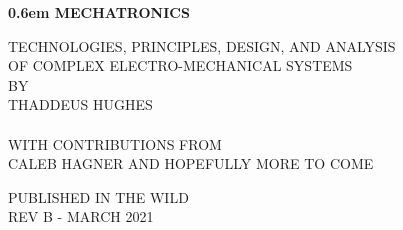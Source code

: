 




\clearpage
\newcommand\nbvspace[1][3]{\vspace*{\stretch{#1}}}
\newcommand\nbstretchyspace{\spaceskip0.5em plus 0.25em minus 0.25em}
\newcommand{\nbtitlestretch}{\spaceskip0.6em}
\pagestyle{plain}
\begin{center}
  \bfseries
  \nbvspace[1]
  \Huge
  {\nbtitlestretch\huge
    MECHATRONICS}

  \nbvspace[1]
  \normalsize
  TECHNOLOGIES, PRINCIPLES, DESIGN, AND ANALYSIS\\
  OF COMPLEX ELECTRO-MECHANICAL SYSTEMS\\
  
  \nbvspace[1]
  \small BY\\
  \Large THADDEUS HUGHES\\
  \ \\
  \tiny WITH CONTRIBUTIONS FROM\\
  \small CALEB HAGNER
  \small AND HOPEFULLY MORE TO COME

  \nbvspace[2]

  \nbvspace[3]
  \normalsize

  \large
  PUBLISHED IN THE WILD \\
  \small REV B - MARCH 2021 \\
\end{center}

\ifdefined\isbook

  \raggedbottom

  \tableofcontents
\fi







\ifdefined\isbook
  \printindex
\fi


